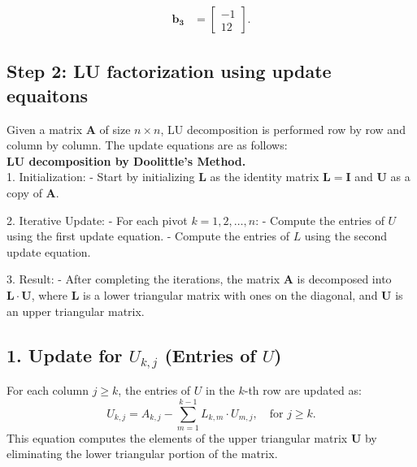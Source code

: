 \documentclass{beamer}
\theoremstyle{remark}
\numberwithin{equation}{section}
\begin{document}
\begin{frame}[fragile]
    \begin{align}
        \mathbf{b_3} &= \begin{bmatrix} -1 \\ 12 \end{bmatrix}.
    \end{align}
    	\subsection*{Step 2: LU factorization using update equaitons}
    Given a matrix $ \mathbf{A} $ of size $ n \times n $, LU decomposition is performed row by row and column by column. The update equations are as follows:\\
    \textbf{LU decomposition by Doolittle's Method.}\\
1. Initialization: 
   - Start by initializing $ \mathbf{L} $ as the identity matrix $ \mathbf{L} = \mathbf{I} $ and $ \mathbf{U} $ as a copy of $ \mathbf{A} $.
   
2. Iterative Update:
   - For each pivot $ k = 1, 2, \ldots, n $:
     - Compute the entries of $ U $ using the first update equation.
     - Compute the entries of $ L $ using the second update equation.
        
\end{frame}
\begin{frame}[fragile]
 3. Result:
   - After completing the iterations, the matrix $ \mathbf{A} $ is decomposed into $ \mathbf{L} \cdot \mathbf{U} $, where $ \mathbf{L} $ is a lower triangular matrix with ones on the diagonal, and $ \mathbf{U} $ is an upper triangular matrix.
\subsection*{1. Update for $ U_{k,j} $ (Entries of $ U $)}

For each column $ j \geq k $, the entries of $ U $ in the $ k $-th row are updated as:
\[
U_{k,j} = A_{k,j} - \sum_{m=1}^{k-1} L_{k,m} \cdot U_{m,j}, \quad \text{for } j \geq k.
\]
This equation computes the elements of the upper triangular matrix $ \mathbf{U} $ by eliminating the lower triangular portion of the matrix.
\end{frame}
\end{document}
